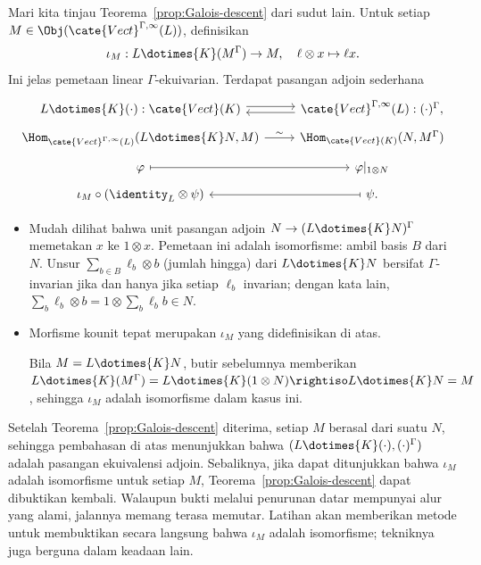 Mari kita tinjau Teorema~\ref{prop:Galois-descent} dari sudut lain. Untuk setiap
$M\in\Obj(\cate{Vect}^{\Gamma,\infty}(L))$, definisikan
\begin{equation}\label{eqn:Galois-descent-iotaM}
	\iota_M: L \dotimes{K} (M^{\Gamma}) \to M, \quad
	\ell \otimes x \mapsto \ell x .
\end{equation}
Ini jelas pemetaan linear $\Gamma$-ekuivarian. Terdapat pasangan adjoin
sederhana
\begin{equation}\label{eqn:Galois-descent-adjunction}
	\begin{tikzcd}[row sep=tiny]
		L \dotimes{K} (\cdot) : \cate{Vect}(K) \arrow[shift left, r] & \cate{Vect}^{\Gamma, \infty}(L) : (\cdot)^{\Gamma}, \arrow[shift left, l] \\
		\Hom_{\cate{Vect}^{\Gamma, \infty}(L)} (L \dotimes{K} N, M) \arrow[r, "\sim"] & \Hom_{\cate{Vect}(K)}(N, M^{\Gamma}) \\
		\varphi \arrow[mapsto, r] & \varphi|_{1 \otimes N} \\
		\iota_M \circ (\identity_L \otimes \psi) & \psi. \arrow[mapsto, l]
	\end{tikzcd}
\end{equation}
\begin{itemize}
	\item Mudah dilihat bahwa unit pasangan adjoin
	$N\to(L\dotimes{K}N)^\Gamma$ memetakan $x$ ke $1\otimes x$. Pemetaan ini
	adalah isomorfisme: ambil basis $B$ dari $N$. Unsur
	$\sum_{b\in B}\ell_b\otimes b$ (jumlah hingga) dari $L\dotimes{K}N$
	bersifat $\Gamma$-invarian jika dan hanya jika setiap $\ell_b$ invarian;
	dengan kata lain,
	$\sum_b\ell_b\otimes b=1\otimes\sum_b\ell_b b\in N$.
	\item Morfisme kounit tepat merupakan $\iota_M$ yang didefinisikan di
	atas.

	Bila $M=L\dotimes{K}N$, butir sebelumnya memberikan
	$L\dotimes{K}(M^\Gamma)=L\dotimes{K}(1\otimes N)\rightiso
	L\dotimes{K}N=M$, sehingga $\iota_M$ adalah isomorfisme dalam kasus ini.
\end{itemize}

Setelah Teorema~\ref{prop:Galois-descent} diterima, setiap $M$ berasal dari
suatu $N$, sehingga pembahasan di atas menunjukkan bahwa
$(L\dotimes{K}(\mathord\cdot),(\mathord\cdot)^\Gamma)$ adalah pasangan
ekuivalensi adjoin. Sebaliknya, jika dapat ditunjukkan bahwa $\iota_M$ adalah
isomorfisme untuk setiap $M$, Teorema~\ref{prop:Galois-descent} dapat
dibuktikan kembali. Walaupun bukti melalui penurunan datar mempunyai alur yang
alami, jalannya memang terasa memutar. Latihan akan memberikan metode untuk
membuktikan secara langsung bahwa $\iota_M$ adalah isomorfisme; tekniknya
juga berguna dalam keadaan lain.

